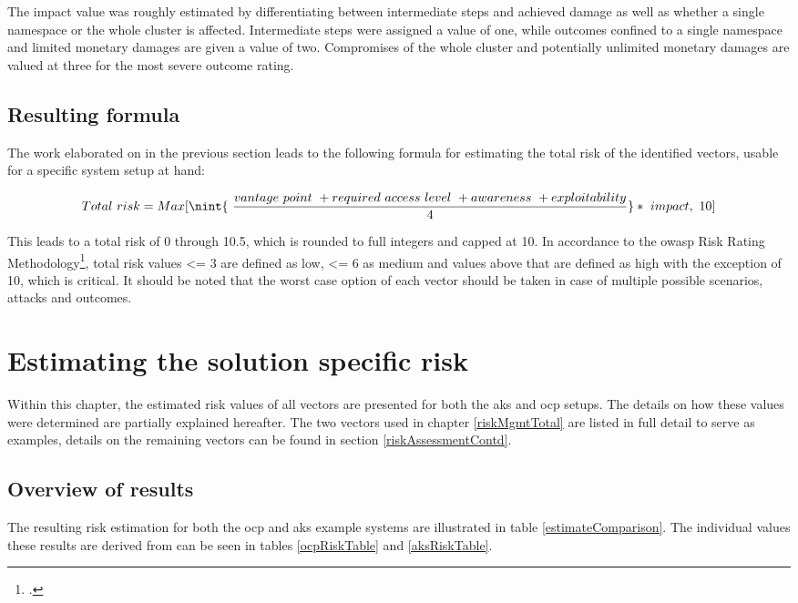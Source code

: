The impact value was roughly estimated by differentiating between intermediate steps and achieved damage as well as whether a single namespace or the whole cluster is affected. Intermediate steps were assigned a value of one, while outcomes confined to a single namespace and limited monetary damages are given a value of two. Compromises of the whole cluster and potentially unlimited monetary damages are valued at three for the most severe outcome rating.

\subsection{Resulting formula}
The work elaborated on in the previous section leads to the following formula for estimating the total risk of the identified vectors, usable for a specific system setup at hand:

$${Total\ risk}= Max[\nint{\ \frac{ {vantage\ point}\ + {required\ access\ level}\ + {awareness}\ + {exploitability} }{4}}*\ impact,\ 10]$$

This leads to a total risk of 0 through 10.5, which is rounded to full integers and capped at 10. In accordance to the \gls{owasp} Risk Rating Methodology\footcite[][, section 'Step 4: Determining the Severity of the Risk']{riskRating}, total risk values <= 3 are defined as low, <= 6 as medium and values above that are defined as high with the exception of 10, which is critical.
It should be noted that the worst case option of each vector should be taken in case of multiple possible scenarios, attacks and outcomes.

\newpage
\section{Estimating the solution specific risk} \label{riskEstimate}

Within this chapter, the estimated risk values of all vectors are presented for both the \gls{aks} and \gls{ocp} setups.
The details on how these values were determined are partially explained hereafter. 
The two vectors used in chapter \ref{riskMgmtTotal} are listed in full detail to serve as examples, details on the remaining vectors can be found in section \ref{riskAssessmentContd}.

\subsection{Overview of results}

The resulting risk estimation for both the \gls{ocp} and \gls{aks} example systems are illustrated in table \ref{estimateComparison}. The individual values these results are derived from can be seen in tables \ref{ocpRiskTable} and \ref{aksRiskTable}. 

